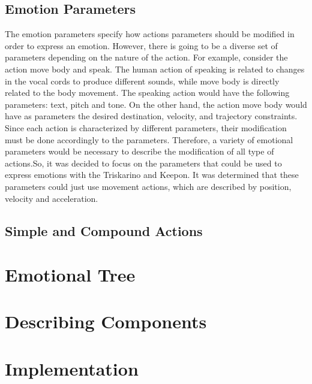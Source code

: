 \documentclass[letterpaper, 10 pt, conference]{ieeeconf}  %
\begin{document}
\subsection{Emotion Parameters}
The emotion parameters specify how actions parameters should be modified in order to express an emotion. However, there is going to be a diverse set of parameters depending on the nature of the action. For example, consider the action move body and speak. The human action of speaking is related to changes in the vocal cords to produce different sounds, while move body is directly related to the body movement. The speaking action would have the following parameters: text, pitch and tone. On the other hand, the action move body would have as parameters the desired destination, velocity, and trajectory constraints. Since each action is characterized by different parameters, their modification must be done accordingly to the parameters. Therefore, a variety of emotional parameters would be necessary to describe the modification of all type of actions.So, it was decided to focus on the parameters that could be used to express emotions with the Triskarino and Keepon. It was determined that these parameters could just use movement actions, which are described by position, velocity and acceleration.    
\subsection{Simple and Compound Actions}
 
\section{Emotional Tree}
\label{sec:emotional_execution_tree}

\section{Describing Components}
\label{sec:description}

\section{Implementation}
\label{sec:implementation}

\end{document}
